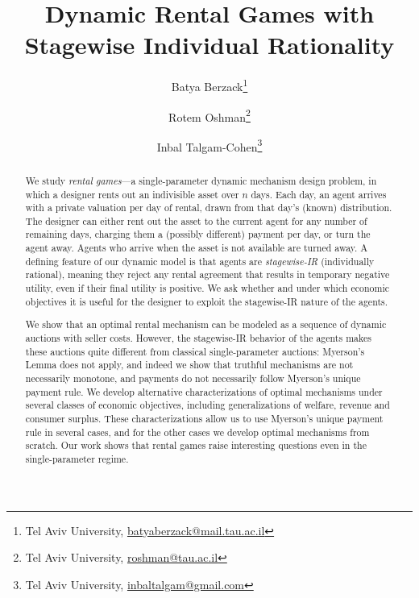\documentclass[11pt,letterpaper]{article}
\title{Dynamic Rental Games with\\Stagewise Individual Rationality
}
\author{
Batya Berzack\thanks{Tel Aviv University, \url{batyaberzack@mail.tau.ac.il}} 
\and
Rotem Oshman\thanks{Tel Aviv University, \url{roshman@tau.ac.il}}
\and
Inbal Talgam-Cohen\thanks{Tel Aviv University, \url{inbaltalgam@gmail.com}}
}
\date{}
\newcommand{\swir}{stagewise-IR\xspace}
\theoremstyle{plain}
\begin{document}
\begin{titlepage}
\maketitle
\begin{abstract}


We study \emph{rental games}---a single-parameter dynamic mechanism design problem, in which a designer rents out an indivisible asset over $n$ days. Each day, an agent arrives with a private valuation per day of rental, drawn from that day's (known) distribution. The designer can either rent out the asset to the current agent for any number of remaining days, charging them a (possibly different) payment per day, or turn the agent away. Agents who arrive when the asset is not available are turned away. A defining feature of our dynamic model is that agents are \emph{\swir} (individually rational), meaning they reject any rental agreement that results in temporary negative utility, even if their final utility is positive. We ask whether and under which economic objectives it is useful for the designer to exploit the \swir nature of the agents. 

We show that an optimal rental mechanism can be modeled as a sequence of dynamic auctions with seller costs. However, the \swir behavior of the agents makes these auctions quite different from classical single-parameter auctions: Myerson's Lemma does not apply, and indeed we show that truthful mechanisms are not necessarily monotone, and payments do not necessarily follow Myerson's unique payment rule. We develop alternative characterizations of optimal mechanisms under several classes of economic objectives, including generalizations of welfare, revenue and consumer surplus. These characterizations allow us to use Myerson's unique payment rule in several cases, and for the other cases we develop optimal mechanisms from scratch. 
Our work shows that rental games raise interesting questions even in the single-parameter regime.

\end{abstract}

\thispagestyle{empty} 
\end{titlepage}

\sloppy
\end{document}
